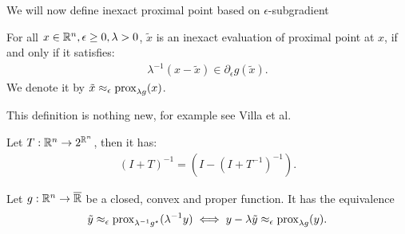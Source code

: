 \documentclass[12pt]{article}
\begin{document}
        We will now define inexact proximal point based on $\epsilon$-subgradient
        \begin{definition}\label{def:inxt-pp}
            For all $x \in \mathbb R^n, \epsilon \ge 0, \lambda > 0$, $\tilde x$ is an inexact evaluation of proximal point at $x$, if and only if it satisfies: 
            \begin{align*}
                \lambda^{-1}(x - \tilde x) \in \partial_{\epsilon} g(\tilde x). 
            \end{align*}
            We denote it by $\tilde x \approx_\epsilon \operatorname{prox}_{\lambda g}(x)$. 
        \end{definition}
        \begin{remark}
            This definition is nothing new, for example see Villa et al. \cite[Definition 2.1]{villa_accelerated_2013}
        \end{remark}
        \begin{fact}\label{fact:resv-identity}
            Let $T: \mathbb R^n \rightarrow 2^{\mathbb R^n}$, then it has: 
            \begin{align*}
                (I + T)^{-1} = (I - (I + T^{-1})^{-1}).
            \end{align*}
        \end{fact}
        \begin{theorem}\label{thm:inxt-moreau-decomp}
            Let $g: \mathbb R^n \rightarrow \overline {\mathbb R}$ be a closed, convex and proper function. 
            It has the equivalence
            \begin{align*}
                \tilde y \approx_\epsilon \operatorname{prox}_{\lambda^{-1}g^\star}(\lambda^{-1}y)
                \iff 
                y - \lambda \tilde y \approx_\epsilon \operatorname{prox}_{\lambda g}(y). 
            \end{align*}
        \end{theorem}
\end{document}
